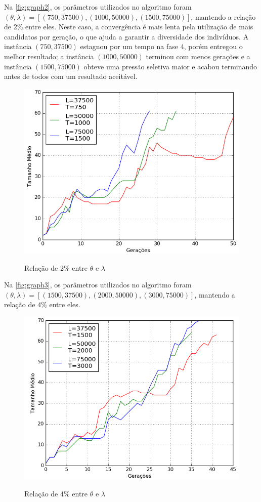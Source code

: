 \documentclass[12pt]{article}
\begin{document}
  Na \autoref{fig:graph2}, os parâmetros utilizados no algoritmo foram $(\theta, \lambda)=[(750, 37500),(1000,50000),(1500,75000)]$, mantendo a relação de $2\%$ entre eles. Neste caso, a convergência é mais lenta pela utilização de mais candidatos por geração, o que ajuda a garantir a diversidade dos indivíduos. A instância $(750, 37500)$ estagnou por um tempo na fase 4, porém entregou o melhor resultado; a instância $(1000,50000)$ terminou com menos gerações e a instância $(1500,75000)$ obteve uma pressão seletiva maior e acabou terminando antes de todos com um resultado aceitável.

  \begin{figure}[!ht]
    \centering
    \caption{Relação de 2\% entre $\theta$ e $\lambda$}
    \includegraphics[scale=0.6]{images/2_100.png}
    \label{fig:graph2}
  \end{figure}

  Na \autoref{fig:graph3}, os parâmetros utilizados no algoritmo foram $(\theta, \lambda)=[(1500, 37500),(2000,50000),(3000,75000)]$, mantendo a relação de $4\%$ entre eles.

  \begin{figure}[!ht]
    \centering
    \caption{Relação de 4\% entre $\theta$ e $\lambda$}
    \includegraphics[scale=0.6]{images/4_100.png}
    \label{fig:graph3}
  \end{figure}
\end{document}
